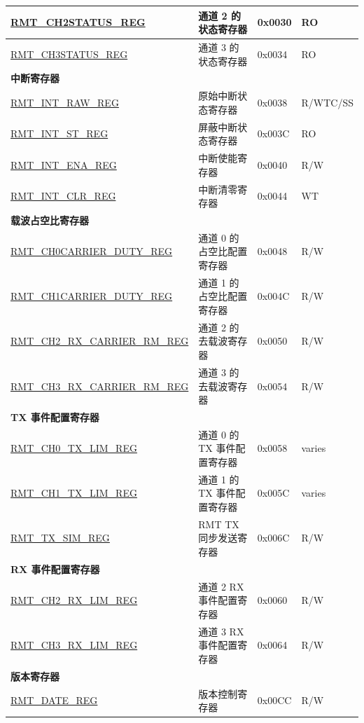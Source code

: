 \begin{longtable}{ | p{6cm} | p{7.2cm} | p{1.3cm} | p{1cm} | }
\hyperref[regdesc:RMTCHMSTATUSREG]{RMT\_CH2STATUS\_REG} & 通道 2 的状态寄存器 & 0x0030 & RO \\ \hline
\hyperref[regdesc:RMTCHMSTATUSREG]{RMT\_CH3STATUS\_REG} & 通道 3 的状态寄存器 & 0x0034 & RO \\ \hline
\multicolumn{4}{|l|}{\textbf{中断寄存器}} \\ \hline
\hyperref[regdesc:RMTINTRAWREG]{RMT\_INT\_RAW\_REG} & 原始中断状态寄存器 & 0x0038 & R/WTC/SS \\ \hline
\hyperref[regdesc:RMTINTSTREG]{RMT\_INT\_ST\_REG} & 屏蔽中断状态寄存器 & 0x003C & RO \\ \hline
\hyperref[regdesc:RMTINTENAREG]{RMT\_INT\_ENA\_REG} & 中断使能寄存器 & 0x0040 & R/W \\ \hline
\hyperref[regdesc:RMTINTCLRREG]{RMT\_INT\_CLR\_REG} & 中断清零寄存器 & 0x0044 & WT \\ \hline
\multicolumn{4}{|l|}{\textbf{载波占空比寄存器}} \\ \hline
\hyperref[regdesc:RMTCHNCARRIERDUTYREG]{RMT\_CH0CARRIER\_DUTY\_REG} & 通道 0 的占空比配置寄存器 & 0x0048 & R/W \\ \hline
\hyperref[regdesc:RMTCHNCARRIERDUTYREG]{RMT\_CH1CARRIER\_DUTY\_REG} & 通道 1 的占空比配置寄存器 & 0x004C & R/W \\ \hline
\hyperref[regdesc:RMTCHMRXCARRIERRMREG]{RMT\_CH2\_RX\_CARRIER\_RM\_REG} & 通道 2 的去载波寄存器 & 0x0050 & R/W \\ \hline
\hyperref[regdesc:RMTCHMRXCARRIERRMREG]{RMT\_CH3\_RX\_CARRIER\_RM\_REG} & 通道 3 的去载波寄存器 & 0x0054 & R/W \\ \hline
\multicolumn{4}{|l|}{\textbf{TX 事件配置寄存器}} \\ \hline
\hyperref[regdesc:RMTCHNTXLIMREG]{RMT\_CH0\_TX\_LIM\_REG} & 通道 0 的 TX 事件配置寄存器 & 0x0058 & varies \\ \hline
\hyperref[regdesc:RMTCHNTXLIMREG]{RMT\_CH1\_TX\_LIM\_REG} & 通道 1 的 TX 事件配置寄存器 & 0x005C & varies \\ \hline
\hyperref[regdesc:RMTTXSIMREG]{RMT\_TX\_SIM\_REG} & RMT TX 同步发送寄存器 & 0x006C & R/W \\ \hline
\multicolumn{4}{|l|}{\textbf{RX 事件配置寄存器}} \\ \hline
\hyperref[regdesc:RMTCHMRXLIMREG]{RMT\_CH2\_RX\_LIM\_REG} & 通道 2 RX 事件配置寄存器 & 0x0060 & R/W \\ \hline
\hyperref[regdesc:RMTCHMRXLIMREG]{RMT\_CH3\_RX\_LIM\_REG} & 通道 3 RX 事件配置寄存器 & 0x0064 & R/W \\ \hline
\multicolumn{4}{|l|}{\textbf{版本寄存器}} \\ \hline
\hyperref[regdesc:RMTDATEREG]{RMT\_DATE\_REG} & 版本控制寄存器 & 0x00CC & R/W \\ \hline
\end{longtable}
